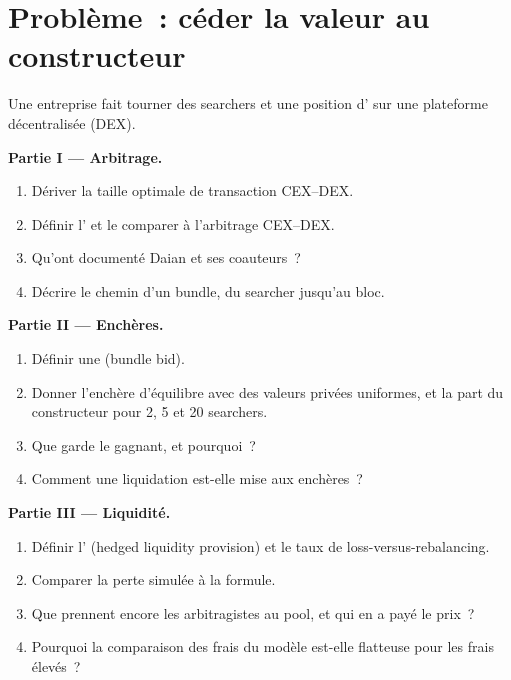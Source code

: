 \section{Problème~: céder la valeur au constructeur}

\begin{problem}\label{pb:hf:on-chain-trading:1}
Une entreprise fait tourner des searchers et une position d' sur une plateforme décentralisée (DEX).

\medskip\noindent\textbf{Partie I --- Arbitrage.}
\begin{enumerate}
\item Dériver la taille optimale de transaction CEX--DEX.
\item Définir l' et le comparer à l'arbitrage CEX--DEX.
\item Qu'ont documenté Daian et ses coauteurs~?
\item Décrire le chemin d'un bundle, du searcher jusqu'au bloc.
\end{enumerate}

\medskip\noindent\textbf{Partie II --- Enchères.}
\begin{enumerate}[resume]
\item Définir une  (bundle bid).
\item Donner l'enchère d'équilibre avec des valeurs privées uniformes, et la part du constructeur pour 2, 5 et 20 searchers.
\item Que garde le gagnant, et pourquoi~?
\item Comment une liquidation est-elle mise aux enchères~?
\end{enumerate}

\medskip\noindent\textbf{Partie III --- Liquidité.}
\begin{enumerate}[resume]
\item Définir l' (hedged liquidity provision) et le taux de loss-versus-rebalancing.
\item Comparer la perte simulée à la formule.
\item Que prennent encore les arbitragistes au pool, et qui en a payé le prix~?
\item Pourquoi la comparaison des frais du modèle est-elle flatteuse pour les frais élevés~?
\end{enumerate}


\end{problem}
